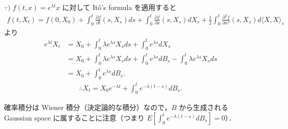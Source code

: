 \documentclass{jsarticle}
\begin{document}
\begin{screen}
    $\because)$
    $f(t, x)=e^{\lambda t}x$ に対して It\^{o}'s formula を適用すると
    \begin{align}
        f(t, X_{t})
        = f(0, X_{0})
        + \int_{0}^{t}\frac{\partial f}{\partial t}(s, X_{s})ds
        + \int_{0}^{t}\frac{\partial f}{\partial x}(s, X_{s})dX_{s}
        + \frac{1}{2}\int_{0}^{t}\frac{\partial^2 f}{\partial x^2}(s, X_{s})d\langle X, X\rangle_{s}
    \end{align}
    より
    \begin{align}
        e^{\lambda t}X_{t}
        &= X_{0}
        + \int_{0}^{t}\lambda e^{\lambda s}X_{s}ds
        + \int_{0}^{t}e^{\lambda s}dX_{s} \\
        &= X_{0}
        + \int_{0}^{t}\lambda e^{\lambda s}X_{s}ds
        + \int_{0}^{t}e^{\lambda s}dB_{s} 
        - \int_{0}^{t}\lambda e^{\lambda s}X_{s}ds \\
        &= X_{0}
        + \int_{0}^{t}e^{\lambda s}dB_{s}.
    \end{align}
    \begin{align}
        \therefore X_{t}
        = X_{0}e^{-\lambda t}
        + \int_{0}^{t}e^{-\lambda(t-s)}dB_{s}.
    \end{align}
\end{screen}

確率積分は Wiener 積分（決定論的な積分）なので，$B$ から生成される Gaussian space に属することに注意（つまり $E[\int_{0}^{t}e^{-\lambda(t-s)}dB_{s}]=0$）．
\end{document}

